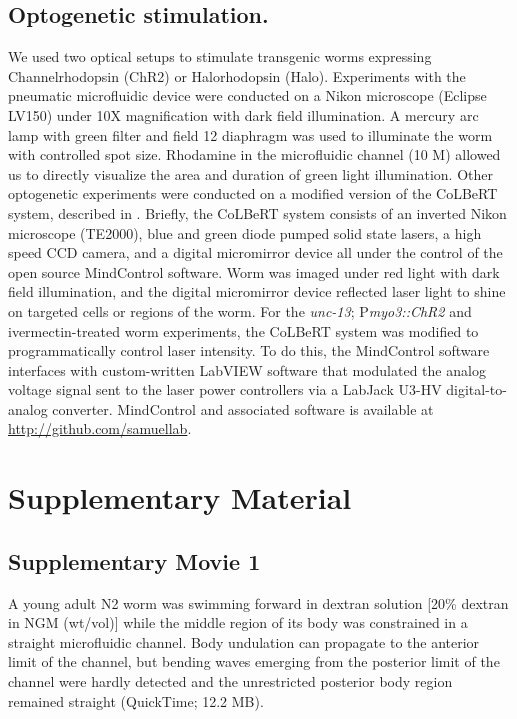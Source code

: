 \subsection{Optogenetic stimulation.}
 We used two optical setups to stimulate transgenic worms expressing 
Channelrhodopsin (ChR2) or Halorhodopsin (Halo). Experiments with the pneumatic 
microfluidic device were conducted on a Nikon microscope (Eclipse LV150) under 10X 
magnification with dark field illumination. A mercury arc lamp with green filter and field 
 12
diaphragm was used to illuminate the worm with controlled spot size. Rhodamine in the 
microfluidic channel (10 \textmu M) allowed us to directly visualize the area and duration of green light 
illumination. 
Other optogenetic experiments were conducted on a modified version of the CoLBeRT system, 
described in \citep{leifer_optogenetic_2011}. Briefly, the CoLBeRT system consists of an inverted Nikon microscope 
(TE2000), blue and green diode pumped solid state lasers, a high speed CCD camera, and a 
digital micromirror device all under the control of the open source MindControl software. Worm 
was imaged under red light with dark field illumination, and the digital micromirror device 
reflected laser light to shine on targeted cells or regions of the worm. For the \textit{unc-13}; 
P\textit{myo3::ChR2} and ivermectin-treated worm experiments, the CoLBeRT system was modified to 
programmatically control laser intensity. To do this, the MindControl software interfaces with 
custom-written LabVIEW software that modulated the analog voltage signal sent to the laser 
power controllers via a LabJack U3-HV digital-to-analog converter. MindControl and associated software is available at \url{http://github.com/samuellab}.  

\section{Supplementary Material}
\subsection{Supplementary Movie 1}\label{movie:prop1}
 
A young adult N2 worm was swimming forward in dextran solution [20\% dextran in NGM 
(wt/vol)] while the middle region of its body was constrained in a straight microfluidic channel. 
Body undulation can propagate to the anterior limit of the channel, but bending waves emerging 
from the posterior limit of the channel were hardly detected and the unrestricted posterior body 
region remained straight (QuickTime; 12.2 MB). 
 
